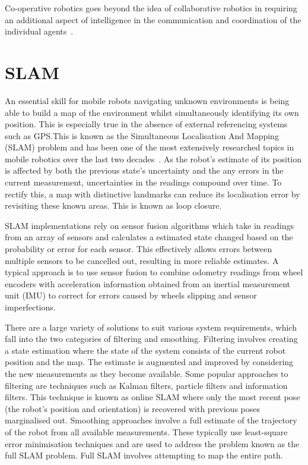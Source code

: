 Co-operative robotics goes beyond the idea
of collaborative robotics in requiring an additional aspect of intelligence in
the communication and coordination of the individual agents~\cite{cao1995cooperative}.

\section{SLAM}\label{litreview/slam}
An essential skill for mobile robots navigating unknown environments is being
able to build a map of the environment whilst simultaneously identifying its own
position. This is especially true in the absence of external referencing systems
such as GPS.\@ This is known as the Simultaneous Localisation And Mapping (SLAM)
problem and has been one of the most extensively researched topics in mobile
robotics over the last two decades~\cite{grisetti2010tutorial}. As the robot's
estimate of its position is affected by both the previous state's uncertainty
and the any errors in the current measurement, uncertainties in the readings compound
over time. To rectify this, a map with distinctive landmarks can reduce its
localisation error by revisiting these known areas. This is known as loop closure.

SLAM implementations rely on sensor fusion algorithms which take in readings from an
array of sensors and calculates a estimated state changed based on the probability
or error for each sensor. This effectively allows errors between multiple sensors
to be cancelled out, resulting in more reliable estimates. A typical approach is to
use sensor fusion to combine odometry readings from wheel encoders with acceleration
information obtained from an inertial measurement unit (IMU) to correct for errors
caused by wheels slipping and sensor imperfections.

There are a large variety of solutions to suit various system requirements, which
fall into the two categories of filtering and smoothing. Filtering
involves creating a state estimation where the state of the system consists of
the current robot position and the map. The estimate is augmented and improved
by considering the new measurements as they become available. Some popular
approaches to filtering are techniques such as Kalman filters, particle filters
and information filters. This technique is known as online SLAM where only the most
recent pose (the robot's position and orientation) is recovered with previous poses
marginalised out. Smoothing approaches involve a full estimate of the trajectory of
the robot from all available
measurements. These typically use least-square error minimisation techniques and are
used to address the problem known as the full SLAM problem. Full SLAM involves
attempting to map the entire path.

